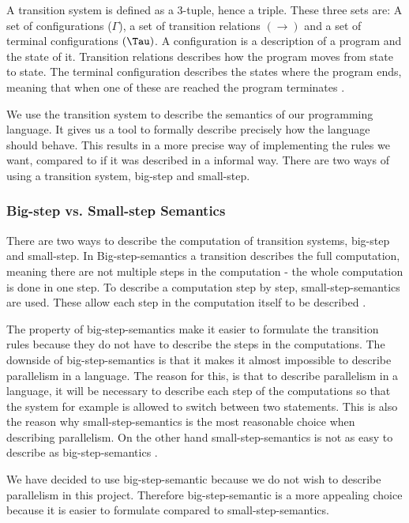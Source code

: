 A transition system is defined as a 3-tuple, hence a triple. These three sets are: A set of configurations ($\Gamma$), a set of transition relations $(\rightarrow)$ and a set of terminal configurations $(\Tau)$.
A configuration is a description of a program and the state of it. Transition relations describes how the program moves from state to state. The terminal configuration describes the states where the program ends, meaning that when one of these are reached the program terminates \citep{HHTree}.

We use the transition system to describe the semantics of our programming language. It gives us a tool to formally describe precisely how the language should behave. This results in a more precise way of implementing the rules we want, compared to if it was described in a informal way. There are two ways of using a transition system, big-step and small-step.

\subsubsection{Big-step vs. Small-step Semantics}
\label{sec:BvsS}
There are two ways to describe the computation of transition systems, big-step and small-step. In Big-step-semantics a transition describes the full computation, meaning there are not multiple steps in the computation - the whole computation is done in one step. To describe a computation step by step, small-step-semantics are used. These allow each step in the computation itself to be described \citep{HHTree}.

The property of big-step-semantics make it easier to formulate the transition rules because they do not have to describe the steps in the computations. The downside of big-step-semantics is that it makes it almost impossible to describe parallelism in a language. The reason for this, is that to describe parallelism in a language, it will be necessary to describe each step of the computations so that the system for example is allowed to switch between two statements. This is also the reason why small-step-semantics is the most reasonable choice when describing parallelism. On the other hand small-step-semantics is not as easy to describe as big-step-semantics \citep{HHTree}.

We have decided to use big-step-semantic because we do not wish to describe parallelism in this project. Therefore big-step-semantic is a more appealing choice because it is easier to formulate compared to small-step-semantics.

